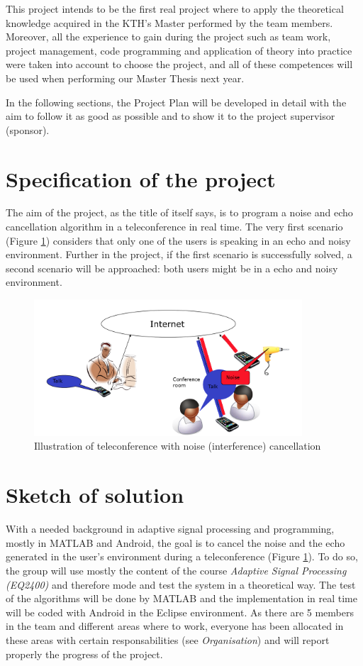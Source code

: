 \documentclass[11pt]{article}
\begin{document}
This project intends to be the first real project where to apply the theoretical knowledge acquired in the KTH's Master performed by the team members. Moreover, all the experience to gain during the project such as team work, project management, code programming and application of theory into practice were taken into account to choose the project, and all of these competences will be used when performing our Master Thesis next year.

In the following sections, the Project Plan will be developed in detail with the aim to follow it as good as possible and to show it to the project supervisor (sponsor).


\section{Specification of the project}

The aim of the project, as the title of itself says, is to program a noise and echo cancellation algorithm in a teleconference in real time. The very first scenario (Figure \ref{scenario}) considers that only one of the users is speaking in an echo and noisy environment. Further in the project, if the first scenario is successfully solved, a second scenario will be approached: both users might be in a echo and noisy environment.

		\begin{figure}[h]
		\centering
		\includegraphics[width=10cm]{scenario}
		\caption{Illustration of teleconference with noise (interference) cancellation}
		\label{scenario}
		\end{figure}

\section{Sketch of solution}


With a needed background in adaptive signal processing and programming, mostly in MATLAB and Android, the goal is to cancel the noise and the echo generated in the user's environment during a teleconference (Figure \ref{scenario}). To do so, the group will use mostly the content of the course \textit{Adaptive Signal Processing (EQ2400)} and therefore mode and test the system in a theoretical way. The test of the algorithms will be done by MATLAB and the implementation in real time will be coded with Android in the Eclipse environment. As there are 5 members in the team and different areas where to work, everyone has been allocated in these areas with certain responsabilities (see \textit{Organisation}) and will report properly the progress of the project.
		
\end{document}
